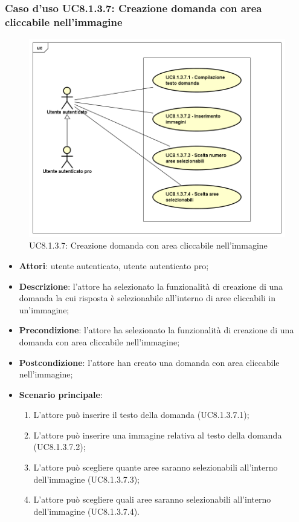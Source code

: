 \subsubsection{Caso d'uso UC8.1.3.7: Creazione domanda con area cliccabile nell'immagine}
\label{UC8.1.3.7}
\begin{figure}[h]
	\centering
	\includegraphics[scale=0.5,keepaspectratio]{UML/UC8_1_3_7.png}
	\caption{UC8.1.3.7: Creazione domanda con area cliccabile nell'immagine}
\end{figure}
\FloatBarrier
\begin{itemize}
	\item \textbf{Attori}: utente autenticato, utente autenticato pro;
	\item \textbf{Descrizione}: l'attore ha selezionato la funzionalità di creazione di una domanda la cui risposta è selezionabile all'interno di aree cliccabili in un'immagine;
	\item \textbf{Precondizione}: l'attore ha selezionato la funzionalità di creazione di una domanda con area cliccabile nell'immagine; 
	\item \textbf{Postcondizione}: l'attore han creato una domanda con area cliccabile nell'immagine;
	\item \textbf{Scenario principale}:
		\begin{enumerate}
	       	\item L'attore può inserire il testo della domanda (UC8.1.3.7.1);
	        \item L'attore può inserire una immagine relativa al testo della domanda (UC8.1.3.7.2);
			\item L'attore può scegliere quante aree saranno selezionabili all'interno dell'immagine (UC8.1.3.7.3);
			\item L'attore può scegliere quali aree saranno selezionabili all'interno dell'immagine (UC8.1.3.7.4).
	 	\end{enumerate}
\end{itemize}

